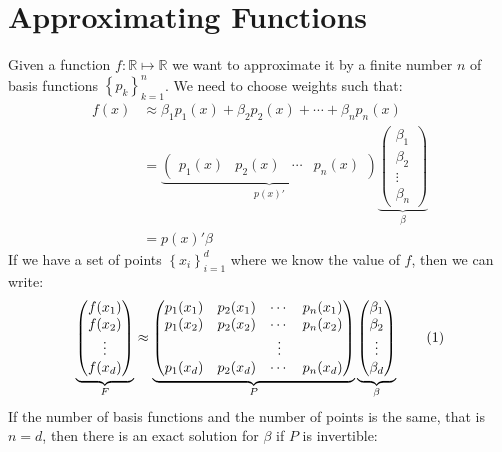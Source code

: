 \documentclass[12pt, a4paper]{article}
\newcommand\numberthis{\addtocounter{equation}{1}\tag{\theequation}}
\newcommand{\Set}[1]{\left\{#1\right\}}
\begin{document}
\section{Approximating Functions}
\label{sec:org3d18a17}
Given a function \(f:\mathbb{R}\mapsto\mathbb{R}\) we want to approximate it by a finite number \(n\) of basis functions \(\Set{p_k}_{k=1}^n\).
We need to choose weights such that:
\begin{align*}
  f(x)&\approx \beta_1 p_1(x) + \beta_2 p_2(x) + \cdots + \beta_n p_n(x)\\
      &=\underbrace{\begin{pmatrix}
        p_1(x) & p_2(x) & \cdots & p_n(x)
      \end{pmatrix}}_{p(x)'}\underbrace{\begin{pmatrix}
        \beta_1\\
        \beta_2\\
        \vdots\\
        \beta_n
      \end{pmatrix}}_{\beta}\\
  &=p(x)'\beta
\end{align*}
If we have a set of points \(\Set{x_i}_{i=1}^d\) where we know the value of \(f\), then we can write:
\begin{align*}
  \underbrace{\begin{pmatrix}
    f(x_1)\\
    f(x_2)\\
    \vdots\\
    f(x_d)
  \end{pmatrix}}_{F}\approx
  \underbrace{\begin{pmatrix}
    p_1(x_1) & p_2(x_1) & \cdots & p_n(x_1)\\
    p_1(x_2) & p_2(x_2) & \cdots & p_n(x_2)\\
    & & \vdots & \\
    p_1(x_d) & p_2(x_d) & \cdots & p_n(x_d)\\
  \end{pmatrix}}_{P}
  \underbrace{\begin{pmatrix}
    \beta_1\\
    \beta_2\\
    \vdots\\
    \beta_d
  \end{pmatrix}}_{\beta}\numberthis{}\label{eq:890_matlab_FPbeta}
\end{align*}
If the number of basis functions and the number of points is the same, that is \(n=d\), then there is an exact solution for \(\beta\) if \(P\) is invertible:
\end{document}
